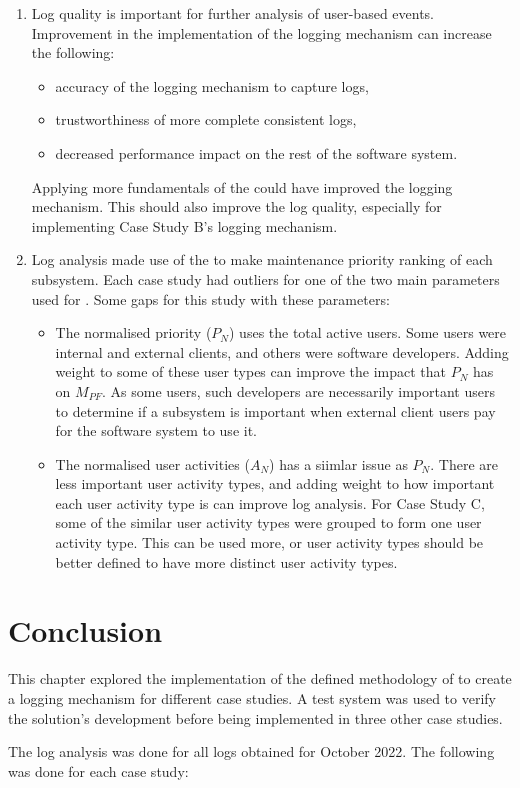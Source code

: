 \begin{enumerate}
	\item Log quality is important for further analysis of user-based events. Improvement in the implementation of the logging mechanism can increase the following:
		\begin{itemize}
			\item accuracy of the logging mechanism to capture logs,
			\item trustworthiness of more complete consistent logs,
			\item decreased performance impact on the rest of the software system.
		\end{itemize}
	Applying more fundamentals of the  could have improved the logging mechanism. This should also improve the log quality, especially for implementing Case Study B's logging mechanism.
	\item Log analysis made use of the  to make maintenance priority ranking of each subsystem. Each case study had outliers for one of the two main parameters used for . Some gaps for this study with these parameters:
		\begin{itemize}
			\item The normalised priority ($P_N$) uses the total active users. Some users were internal and external clients, and others were software developers. Adding weight to some of these user types can improve the impact that $P_N$ has on $M_{PF}$. As some users, such developers are necessarily important users to determine if a subsystem is important when external client users pay for the software system to use it.
			\item The normalised user activities ($A_N$) has a siimlar issue as $P_N$. There are less important user activity types, and adding weight to how important each user activity type is can improve log analysis. For Case Study C, some of the similar user activity types were grouped to form one user activity type. This can be used more, or user activity types should be better defined to have more distinct user activity types.
		\end{itemize}
\end{enumerate}

\section{Conclusion}
This chapter explored the implementation of the defined methodology of  to create a logging mechanism for different case studies. A test system was used to verify the solution's development before being implemented in three other case studies.\par The log analysis was done for all logs obtained for October 2022. The following was done for each case study:

